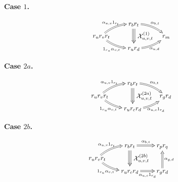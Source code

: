 \documentclass[a4paper, twoside, 11pt, english]{article}
\newcommand{\caseconfluence}[1]{%
\[
\scalebox{0.9}{$#1$}
\]
}
\begin{document}
\noindent
\begin{minipage}[t]{0.32\textwidth}
\centering
\textbf{Case $1$.}

\caseconfluence{
\xymatrix @R=0.75em @C=1.8em @!C {
        & r_b r_t
         \ar@2@/^/[dr]^-{\alpha_{b,t}}
        \ar@3[]!<0pt,-8pt>;[dd]!<0pt,8pt>^-*+{\mathcal X^{(1)}_{u,v,t}}
        \\
r_u r_v r_t
        \ar@2@/^/[ur]^-{\alpha_{u,v}1_{r_t}}
        \ar@2@/_/[dr]_-{1_{r_u}\alpha_{v,t}}
&& r_m
        \\
        & r_u r_d
        \ar@2@/_/[ur]_-{\alpha_{u,d}}
}
}
\end{minipage}
\hfill
\begin{minipage}[t]{0.32\textwidth}
\centering
\textbf{Case $2a$.}

\caseconfluence{
\xymatrix @R=0.75em @C=1.8em @!C {
        & r_b r_t
          \ar@2@/^/[dr]^-{\alpha_{b,t}}
        \ar@3[]!<0pt,-8pt>;[dd]!<0pt,8pt>^-*+{\mathcal X^{(2a)}_{u,v,t}}
        \\
r_u r_v r_t
        \ar@2@/^/[ur]^-{\alpha_{u,v}1_{r_t}}
        \ar@2@/_/[dr]_-{1_{r_u}\alpha_{v,t}}
& & r_g r_d
\\
        & r_u r_c r_d
          \ar@2@/_/[ur]_-{\alpha_{u,c}1_{r_d}}
}
}
\end{minipage}
\hfill
\begin{minipage}[t]{0.32\textwidth}
\centering
\textbf{Case $2b$.}

\caseconfluence{
\xymatrix @R=0.75em @C=1.8em @!C {
        & r_b r_t
         \ar@2[r]^-{\alpha_{b,t}}
        \ar@3[]!<0pt,-8pt>;[dd]!<0pt,8pt>^-*+{\mathcal X^{(2b)}_{u,v,t}}
    & r_p r_q
        \\
r_u r_v r_t
        \ar@2@/^/[ur]^-{\alpha_{u,v}1_{r_t}}
        \ar@2@/_/[dr]_-{1_{r_u}\alpha_{v,t}}
        \\
        & r_u r_c r_d
        \ar@2[r]_-{\alpha_{u,c}1_{r_d}}
        & r_g r_d
        \ar@2[uu]_-{\alpha_{g,d}}
}
}
\end{minipage}

\medskip
\end{document}
